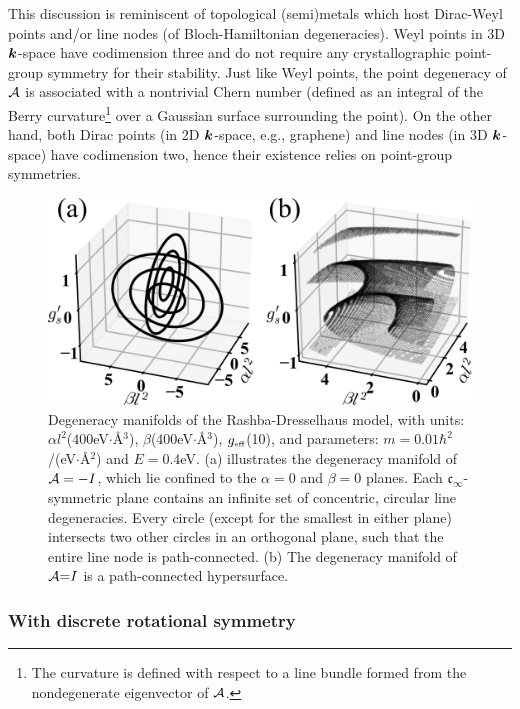 \documentclass[aps, prb, showpacs, twocolumn, notitlepage, superscriptaddress]{revtex4-1}
\begin{document}
This discussion is reminiscent of topological (semi)metals which host Dirac-Weyl points and/or line nodes (of Bloch-Hamiltonian degeneracies). Weyl points in 3D $\boldsymbol{k}$-space have codimension three and do not require any crystallographic point-group symmetry for their stability. Just like Weyl points, the point degeneracy of ${\cal A}$ is associated with a nontrivial Chern number (defined as an integral of the Berry curvature\footnote{The curvature is defined with respect to a line bundle formed from the nondegenerate eigenvector of ${\cal A}$.} over a Gaussian surface surrounding the point). On the other hand,  both Dirac points (in 2D $\boldsymbol{k}$-space, e.g., graphene) and  line nodes (in 3D $\boldsymbol{k}$-space) have codimension two, hence their existence relies on point-group symmetries.  



\begin{figure}
\includegraphics[width=1.0\columnwidth]{dgn.png}
\caption{Degeneracy manifolds of the Rashba-Dresselhaus model, with units: $\alpha l^2$($400$eV$\cdot$\AA$^3$), $\beta$($400$eV$\cdot$\AA$^3$), $g_{\scriptscriptstyle{\text{eff}}}$(10), and parameters: $m=0.01\hbar^2$/(eV$\cdot$\AA$^2$) and $E=0.4$eV. (a) illustrates the degeneracy manifold of ${\cal A}=-I$, which lie confined to  the $\alpha{=}0$ and $\beta{=}0$ planes. Each $\mathfrak{c}_{\infty}$-symmetric plane contains an infinite set of concentric, circular line degeneracies. Every circle (except for the smallest in either plane)  intersects two other circles in an orthogonal plane, such that the entire line node is path-connected. (b) The degeneracy manifold of ${\cal A}{=}I$ is a path-connected hypersurface.  \label{fig:dgn}}
\end{figure}

\subsubsection{With discrete rotational symmetry}
\end{document}
